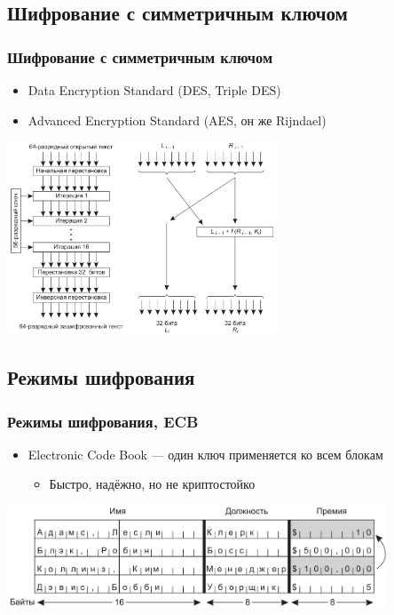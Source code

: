 \documentclass{../cscslides}
\begin{document}
    \subsection{Шифрование с симметричным ключом}

    \begin{frame}
        \frametitle{Шифрование с симметричным ключом}
        \begin{itemize}
            \item Data Encryption Standard (DES, Triple DES)
            \item Advanced Encryption Standard (AES, он же Rijndael)
        \end{itemize}
        \begin{center}
            \includegraphics[width=0.6\textwidth]{des.png}
        \end{center}
    \end{frame}

    \subsection{Режимы шифрования}

    \begin{frame}
        \frametitle{Режимы шифрования, ECB}
        \begin{itemize}
            \item Electronic Code Book --- один ключ применяется ко всем блокам
            \begin{itemize}
                \item Быстро, надёжно, но не криптостойко
            \end{itemize}
        \end{itemize}
        \begin{center}
            \includegraphics[width=0.85\textwidth]{ecbAttack.png}
        \end{center}
    \end{frame}
\end{document}
